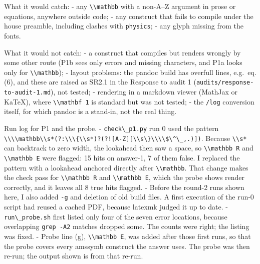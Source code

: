 \documentclass[11pt,a4paper]{article}
\newcommand{\passthrough}[1]{#1}
\begin{document}
What it would catch: - any \passthrough{\lstinline!\\mathbb!} with a
non-A--Z argument in prose or equations, anywhere outside code; - any
construct that fails to compile under the house preamble, including
clashes with \passthrough{\lstinline!physics!}; - any glyph missing from
the fonts.

What it would not catch: - a construct that compiles but renders wrongly
by some other route (P1b sees only errors and missing characters, and
P1a looks only for \passthrough{\lstinline!\\mathbb!}); - layout
problems: the pandoc build has overfull lines, e.g.~eq. (6), and these
are raised as SR2.1 in the Response to audit 1
(\passthrough{\lstinline!audits/response-to-audit-1.md!}), not tested; -
rendering in a markdown viewer (MathJax or KaTeX), where
\passthrough{\lstinline!\\mathbf 1!} is standard but was not tested; -
the \passthrough{\lstinline!/log!} conversion itself, for which pandoc
is a stand-in, not the real thing.

Run log for P1 and the probe. - \passthrough{\lstinline!check\_p1.py!}
run 0 used the pattern
\passthrough{\lstinline"\\\\mathbb\\s*(?:\\\{\\s*)?(?![A-Z][\\s\}\\\\$\^\_,.)])"}.
Because \passthrough{\lstinline!\\s*!} can backtrack to zero width, the
lookahead then saw a space, so \passthrough{\lstinline!\\mathbb R!} and
\passthrough{\lstinline!\\mathbb E!} were flagged: 15 hits on answer-1,
7 of them false. I replaced the pattern with a lookahead anchored
directly after \passthrough{\lstinline!\\mathbb!}. That change makes the
check pass for \passthrough{\lstinline!\\mathbb R!} and
\passthrough{\lstinline!\\mathbb E!}, which the probe shows render
correctly, and it leaves all 8 true hits flagged. - Before the round-2
runs shown here, I also added \passthrough{\lstinline!-g!} and deletion
of old build files. A first execution of the run-0 script had reused a
cached PDF, because latexmk judged it up to date. -
\passthrough{\lstinline!run\_probe.sh!} first listed only four of the
seven error locations, because overlapping
\passthrough{\lstinline!grep -A2!} matches dropped some. The counts were
right; the listing was fixed. - Probe line (g),
\passthrough{\lstinline!\\mathbb E!}, was added after those first runs,
so that the probe covers every amssymb construct the answer uses. The
probe was then re-run; the output shown is from that re-run.
\end{document}
